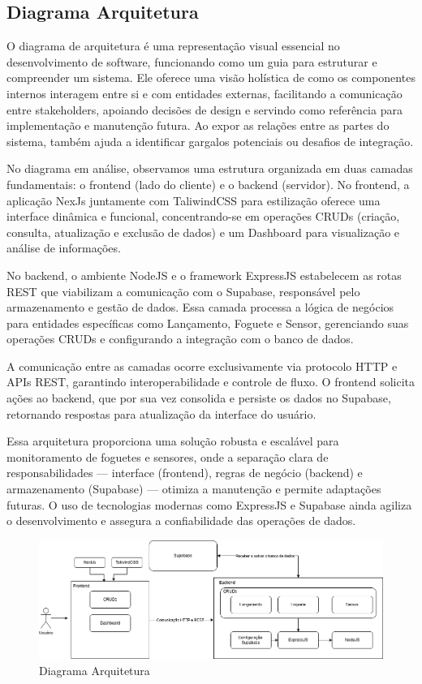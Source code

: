     
  \subsection{Diagrama Arquitetura}
  O diagrama de arquitetura é uma representação visual essencial no desenvolvimento de software, funcionando como um guia para estruturar e compreender um sistema. Ele oferece uma visão holística de como os componentes internos interagem entre si e com entidades externas, facilitando a comunicação entre stakeholders, apoiando decisões de design e servindo como referência para implementação e manutenção futura. Ao expor as relações entre as partes do sistema, também ajuda a identificar gargalos potenciais ou desafios de integração.

No diagrama em análise, observamos uma estrutura organizada em duas camadas fundamentais: o frontend (lado do cliente) e o backend (servidor). No frontend, a aplicação NexJs juntamente com TaliwindCSS para estilização oferece uma interface dinâmica e funcional, concentrando-se em operações CRUDs (criação, consulta, atualização e exclusão de dados) e um Dashboard para visualização e análise de informações.

No backend, o ambiente NodeJS e o framework ExpressJS estabelecem as rotas REST que viabilizam a comunicação com o Supabase, responsável pelo armazenamento e gestão de dados. Essa camada processa a lógica de negócios para entidades específicas como Lançamento, Foguete e Sensor, gerenciando suas operações CRUDs e configurando a integração com o banco de dados.

A comunicação entre as camadas ocorre exclusivamente via protocolo HTTP e APIs REST, garantindo interoperabilidade e controle de fluxo. O frontend solicita ações ao backend, que por sua vez consolida e persiste os dados no Supabase, retornando respostas para atualização da interface do usuário.

Essa arquitetura proporciona uma solução robusta e escalável para monitoramento de foguetes e sensores, onde a separação clara de responsabilidades — interface (frontend), regras de negócio (backend) e armazenamento (Supabase) — otimiza a manutenção e permite adaptações futuras. O uso de tecnologias modernas como ExpressJS e Supabase ainda agiliza o desenvolvimento e assegura a confiabilidade das operações de dados.

\begin{figure}[H]
  \centering
  \includegraphics[width=0.9\linewidth]{editaveis/figuras/diagrama_arquitetura.png}
  \caption{Diagrama Arquitetura}
  \label{fig:enter-label}
\end{figure}



